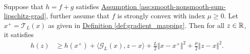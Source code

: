 \documentclass[12pt]{article}
\begin{document}
    \begin{lemma}
    \label{lemma:grad_map_linearization}\; \\
        Suppose that $h = f + g$ satisfies 
        \hyperref[ass:smooth-nonsmooth-sum-lipschitz-grad]
        {Assumption \ref*{ass:smooth-nonsmooth-sum-lipschitz-grad}}, 
        further assume that $f$ is strongly convex with index $\mu \ge 0$. 
        Let $x^+ = \mathcal T_L(x)$ as given in 
        \hyperref[def:gradient_mapping]{Definition \ref*{def:gradient_mapping}}. 
        Then for all $z \in \mathbb R$, it satisfies
        \begin{align*}
            h(z) &\ge 
            h(x^+) + 
            \langle \mathcal G_L (x), z - x\rangle 
            + 
            \frac{L}{2}\Vert x - x^+\Vert^2 + \frac{\mu}{2}
            \Vert z - x\Vert^2. 
        \end{align*}
    \end{lemma}
\end{document}
